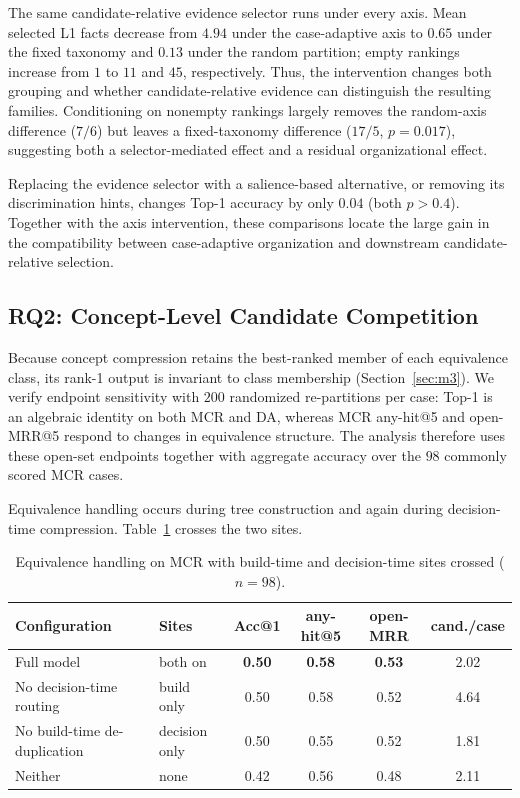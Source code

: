 \documentclass[letterpaper]{article} %
\begin{document}
The same candidate-relative evidence selector runs under every axis.
Mean selected L1 facts decrease from $4.94$ under the case-adaptive axis to $0.65$ under the fixed taxonomy and $0.13$ under the random partition; empty rankings increase from $1$ to $11$ and $45$, respectively.
Thus, the intervention changes both grouping and whether candidate-relative evidence can distinguish the resulting families.
Conditioning on nonempty rankings largely removes the random-axis difference ($7/6$) but leaves a fixed-taxonomy difference ($17/5$, $p=0.017$), suggesting both a selector-mediated effect and a residual organizational effect.

Replacing the evidence selector with a salience-based alternative, or removing its discrimination hints, changes Top-1 accuracy by only $0.04$ (both $p>0.4$).
Together with the axis intervention, these comparisons locate the large gain in the compatibility between case-adaptive organization and downstream candidate-relative selection.

\subsection{RQ2: Concept-Level Candidate Competition}
\label{sec:res-eq}

Because concept compression retains the best-ranked member of each equivalence class, its rank-1 output is invariant to class membership (Section~\ref{sec:m3}).
We verify endpoint sensitivity with $200$ randomized re-partitions per case: Top-1 is an algebraic identity on both MCR and DA, whereas MCR any-hit@5 and open-MRR@5 respond to changes in equivalence structure.
The analysis therefore uses these open-set endpoints together with aggregate accuracy over the $98$ commonly scored MCR cases.

Equivalence handling occurs during tree construction and again during decision-time compression.
Table~\ref{tab:eq-site} crosses the two sites.

\begin{table}[t]
\centering
\small
\begin{tabular}{llcccc}
\toprule
Configuration & Sites & Acc@1 & any-hit@5 & open-MRR & cand./case \\
\midrule
Full model & both on & \textbf{0.50} & \textbf{0.58} & \textbf{0.53} & 2.02 \\
No decision-time routing & build only & 0.50 & 0.58 & 0.52 & 4.64 \\
No build-time de-duplication & decision only & 0.50 & 0.55 & 0.52 & 1.81 \\
Neither & none & 0.42 & 0.56 & 0.48 & 2.11 \\
\bottomrule
\end{tabular}
\caption{Equivalence handling on MCR with build-time and decision-time sites crossed ($n{=}98$).}
\label{tab:eq-site}

\end{table}
\end{document}

